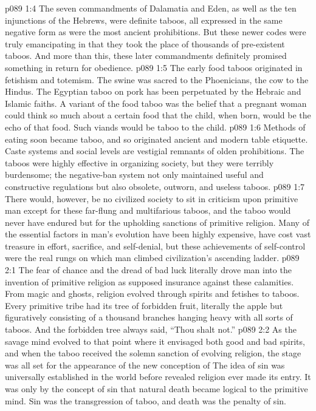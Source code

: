 \vs p089 1:4 The seven commandments of Dalamatia and Eden, as well as the ten injunctions of the Hebrews, were definite taboos, all expressed in the same negative form as were the most ancient prohibitions. But these newer codes were truly emancipating in that they took the place of thousands of pre\hyp{}existent taboos. And more than this, these later commandments definitely promised something in return for obedience.
\vs p089 1:5 The early food taboos originated in fetishism and totemism. The swine was sacred to the Phoenicians, the cow to the Hindus. The Egyptian taboo on pork has been perpetuated by the Hebraic and Islamic faiths. A variant of the food taboo was the belief that a pregnant woman could think so much about a certain food that the child, when born, would be the echo of that food. Such viands would be taboo to the child.
\vs p089 1:6 Methods of eating soon became taboo, and so originated ancient and modern table etiquette. Caste systems and social levels are vestigial remnants of olden prohibitions. The taboos were highly effective in organizing society, but they were terribly burdensome; the negative\hyp{}ban system not only maintained useful and constructive regulations but also obsolete, outworn, and useless taboos.
\vs p089 1:7 There would, however, be no civilized society to sit in criticism upon primitive man except for these far\hyp{}flung and multifarious taboos, and the taboo would never have endured but for the upholding sanctions of primitive religion. Many of the essential factors in man’s evolution have been highly expensive, have cost vast treasure in effort, sacrifice, and self\hyp{}denial, but these achievements of self\hyp{}control were the real rungs on which man climbed civilization’s ascending ladder.
\vs p089 2:1 The fear of chance and the dread of bad luck literally drove man into the invention of primitive religion as supposed insurance against these calamities. From magic and ghosts, religion evolved through spirits and fetishes to taboos. Every primitive tribe had its tree of forbidden fruit, literally the apple but figuratively consisting of a thousand branches hanging heavy with all sorts of taboos. And the forbidden tree always said, “Thou shalt not.”
\vs p089 2:2 As the savage mind evolved to that point where it envisaged both good and bad spirits, and when the taboo received the solemn sanction of evolving religion, the stage was all set for the appearance of the new conception of  The idea of sin was universally established in the world before revealed religion ever made its entry. It was only by the concept of sin that natural death became logical to the primitive mind. Sin was the transgression of taboo, and death was the penalty of sin.
